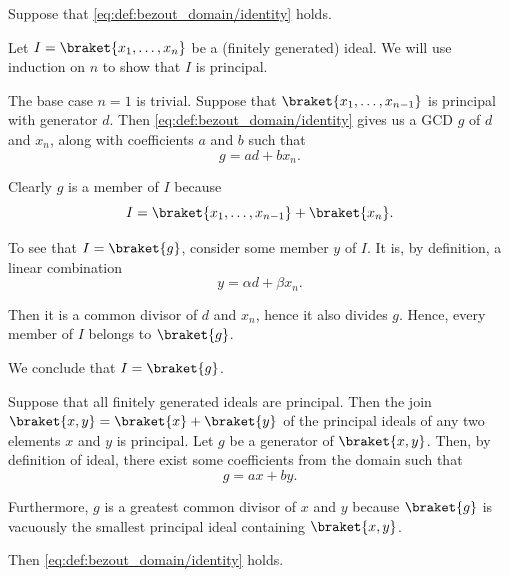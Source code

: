 \begin{defproof}
   Suppose that \eqref{eq:def:bezout_domain/identity} holds.

  Let \( I = \braket{ x_1, \ldots, x_n } \) be a (finitely generated) ideal. We will use induction on \( n \) to show that \( I \) is principal.

  The base case \( n = 1 \) is trivial. Suppose that \( \braket{ x_1, \ldots, x_{n-1} } \) is principal with generator \( d \). Then \eqref{eq:def:bezout_domain/identity} gives us a GCD \( g \) of \( d \) and \( x_n \), along with coefficients \( a \) and \( b \) such that
  \begin{equation*}
    g = ad + bx_n.
  \end{equation*}

  Clearly \( g \) is a member of \( I \) because
  \begin{equation*}
    I = \braket{ x_1, \ldots, x_{n-1} } + \braket{ x_n }.
  \end{equation*}

  To see that \( I = \braket{ g } \), consider some member \( y \) of \( I \). It is, by definition, a linear combination
  \begin{equation*}
    y = \alpha d + \beta x_n.
  \end{equation*}

  Then it is a common divisor of \( d \) and \( x_n \), hence it also divides \( g \). Hence, every member of \( I \) belongs to \( \braket{ g } \).

  We conclude that \( I = \braket{ g } \).

   Suppose that all finitely generated ideals are principal. Then the join \( \braket{ x, y } =\braket{ x } + \braket{ y } \) of the principal ideals of any two elements \( x \) and \( y \) is principal. Let \( g \) be a generator of \( \braket{ x, y } \). Then, by definition of ideal, there exist some coefficients from the domain such that
  \begin{equation*}
    g = ax + by.
  \end{equation*}

  Furthermore, \( g \) is a greatest common divisor of \( x \) and \( y \) because \( \braket{ g } \) is vacuously the smallest principal ideal containing \( \braket{ x, y } \).

  Then \eqref{eq:def:bezout_domain/identity} holds.
\end{defproof}

